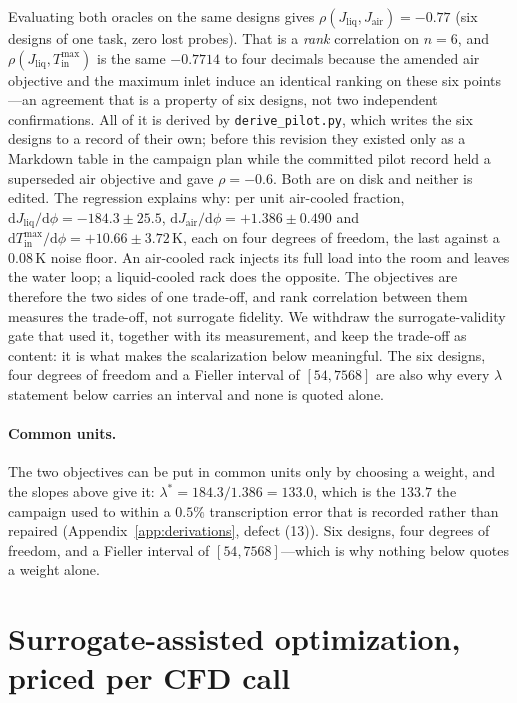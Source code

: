 \documentclass{article}
\newcommand{\Jliq}{J_{\mathrm{liq}}}
\newcommand{\Jair}{J_{\mathrm{air}}}
\begin{document}
Evaluating both oracles on the same designs gives $\rho(\Jliq, \Jair) = -0.77$ (six
designs of one task, zero lost probes).  That is a \emph{rank} correlation on $n = 6$,
and $\rho(\Jliq, T^{\max}_{\mathrm{in}})$ is the same $-0.7714$ to four decimals because
the amended air objective and the maximum inlet induce an identical ranking on these six
points---an agreement that is a property of six designs, not two independent
confirmations.  All of it is derived by \texttt{derive\_pilot.py}, which writes the six
designs to a record of their own; before this revision they existed only as a Markdown
table in the campaign plan while the committed pilot record held a superseded air
objective and gave $\rho = -0.6$.  Both are on disk and neither is edited.  The regression
explains why: per unit air-cooled fraction,
$\mathrm{d}\Jliq/\mathrm{d}\phi = -184.3 \pm 25.5$,
$\mathrm{d}\Jair/\mathrm{d}\phi = +1.386 \pm 0.490$ and
$\mathrm{d}T^{\max}_{\mathrm{in}}/\mathrm{d}\phi = +10.66 \pm 3.72$\,K, each on four
degrees of freedom, the last against a $0.08$\,K noise floor.  An air-cooled rack injects
its full load into the room and leaves the water loop; a liquid-cooled rack does the
opposite.  The objectives are therefore the two sides of one trade-off, and rank
correlation between them measures the trade-off, not surrogate fidelity.  We withdraw the
surrogate-validity gate that used it, together with its measurement, and keep the
trade-off as content: it is what makes the scalarization below meaningful.  The six
designs, four degrees of freedom and a Fieller interval of $[54, 7568]$ are also why
every $\lambda$ statement below carries an interval and none is quoted alone.

\paragraph{Common units.}
The two objectives can be put in common units only by choosing a weight, and the slopes
above give it: $\lambda^* = 184.3/1.386 = 133.0$, which is the $133.7$ the campaign used
to within a $0.5\%$ transcription error that is recorded rather than repaired
(Appendix~\ref{app:derivations}, defect (13)).  Six designs, four degrees of freedom, and
a Fieller interval of $[54, 7568]$---which is why nothing below quotes a weight alone.

\section{Surrogate-assisted optimization, priced per CFD call}
\label{sec:search}
\end{document}
